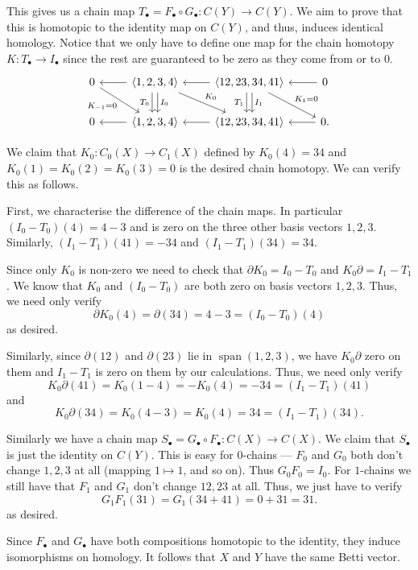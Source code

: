 \documentclass[12 pt, letterpaper]{hmcpset}
\begin{document}
\begin{solution}
	This gives us a chain map $T_{\bullet} = F_{\bullet} \circ G_{\bullet} : C(Y) \to C(Y)$. We aim to prove that this is homotopic to the identity map on $C(Y)$, and thus, induces identical homology. Notice that we only have to define one map for the chain homotopy $K : T_{\bullet} \to I_{\bullet}$ since the rest are guaranteed to be zero as they come from or to $0$.
	\[
		\begin{tikzcd}
			0 \ar[rd, "K_{-1} = 0"'] & \ar[l] \ar[d, "T_{0}"', shift right] \ar[d, "I_{0}", shift left] \ar[rd, "K_{0}"] \left < 1, 2, 3, 4 \right > & \ar[l] \ar[d, "T_{1}"', shift right] \ar[d, "I_{1}", shift left] \ar[rd, "K_{1} = 0"] \left < 12, 23, 34, 41 \right > & \ar[l] 0 \\
			0 & \ar[l] \left < 1, 2, 3, 4 \right > & \ar[l] \left < 12, 23, 34, 41 \right > & \ar[l] 0.
		\end{tikzcd}
	\]

	We claim that $K_{0} : C_{0}(X) \to C_{1}(X)$ defined by $K_{0}(4) = 34$ and $K_{0}(1) = K_{0}(2) = K_{0}(3) = 0$ is the desired chain homotopy. We can verify this as follows. 

	First, we characterise the difference of the chain maps. In particular $(I_{0} - T_{0})(4) = 4 - 3$ and is zero on the three other basis vectors $1, 2, 3$. Similarly, $(I_{1} - T_{1})(41) = - 34$ and $(I_{1} - T_{1})(34) = 34$.

	Since only $K_{0}$ is non-zero we need to check that $\partial K_{0} = I_{0} - T_{0}$ and $K_{0} \partial = I_{1} - T_{1}$. We know that $K_{0}$ and $(I_{0} - T_{0})$ are both zero on basis vectors  $1, 2, 3$. Thus, we need only verify
	\[
		\partial K_{0}(4) = \partial(34) = 4 - 3 = (I_{0} - T_{0})(4)
	\]
	as desired.

	Similarly, since  $\partial(12)$ and $\partial(23)$ lie in  $\operatorname{span}(1, 2, 3)$, we have $K_{0} \partial$ zero on them and $I_{1} - T_{1}$ is zero on them by our calculations. Thus, we need only verify
	\[
		K_{0} \partial(41) = K_{0}(1 - 4) = - K_{0}(4) = - 34 = (I_{1} - T_{1})(41)
	\]
	and
	\[
		K_{0} \partial(34) = K_{0}(4 - 3) = K_{0}(4) = 34 = (I_{1} - T_{1})(34).
	\]

	Similarly we have a chain map $S_{\bullet} = G_{\bullet} \circ F_{\bullet} : C(X) \to C(X)$. We claim that $S_{\bullet}$ is just the identity on $C(Y)$. This is easy for $0$-chains --- $F_{0}$ and $G_{0}$ both don't change $1, 2, 3$ at all (mapping $1 \mapsto 1$, and so on). Thus $G_{0} F_{0} = I_{0}$. For $1$-chains we still have that $F_{1}$ and $G_{1}$ don't change $12, 23$ at all. Thus, we just have to verify
	\[
		G_{1} F_{1}(31) = G_{1}(34 + 41) = 0 + 31 = 31. 
	\]
	as desired.

	Since $F_{\bullet}$ and $G_{\bullet}$ have both compositions homotopic to the identity, they induce isomorphisms on homology. It follows that $X$ and $Y$ have the same Betti vector.
\end{solution}
\end{document}
